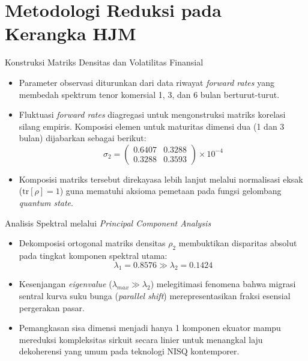 \section{Metodologi Reduksi pada Kerangka HJM}

\begin{frame}{Konstruksi Matriks Densitas dan Volatilitas Finansial}
    \begin{itemize}
        \item Parameter observasi diturunkan dari data riwayat \textit{forward rates} yang membedah spektrum tenor komersial 1, 3, dan 6 bulan berturut-turut.
        \item Fluktuasi \textit{forward rates} diagregasi untuk mengonstruksi matriks korelasi silang empiris. Komposisi elemen untuk maturitas dimensi dua (1 dan 3 bulan) dijabarkan sebagai berikut:
        $$ \sigma_2 = \begin{pmatrix} 0.6407 & 0.3288 \\ 0.3288 & 0.3593 \end{pmatrix} \times 10^{-4} $$
        \item Komposisi matriks tersebut direkayasa lebih lanjut melalui normalisasi eksak ($\text{tr}[\rho] = 1$) guna mematuhi aksioma pemetaan pada fungsi gelombang \textit{quantum state}.
    \end{itemize}
\end{frame}

\begin{frame}{Analisis Spektral melalui \textit{Principal Component Analysis}}
    \begin{itemize}
        \item Dekomposisi ortogonal matriks densitas $\rho_2$ membuktikan disparitas absolut pada tingkat komponen spektral utama:
        $$ \lambda_1 = 0.8576 \gg \lambda_2 = 0.1424 $$
        \item Kesenjangan \textit{eigenvalue} ($\lambda_{max} \gg \lambda_2$) melegitimasi fenomena bahwa migrasi sentral kurva suku bunga (\textit{parallel shift}) merepresentasikan fraksi esensial pergerakan pasar.
        \item Pemangkasan sisa dimensi menjadi hanya 1 komponen ekuator mampu mereduksi kompleksitas sirkuit secara linier untuk menangkal laju dekoherensi yang umum pada teknologi NISQ kontemporer.
    \end{itemize}
\end{frame}

